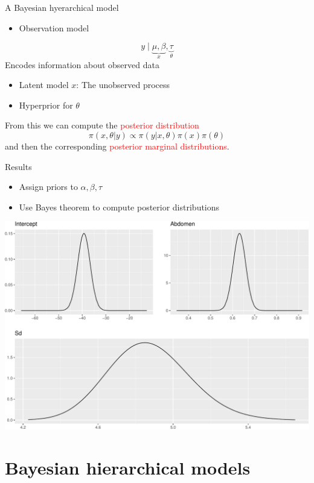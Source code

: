 \documentclass[
  ignorenonframetext,
]{beamer}
\providecommand{\tightlist}{%
  \setlength{\itemsep}{0pt}\setlength{\parskip}{0pt}}
\begin{document}
\begin{frame}{A Bayesian hyerarchical model}
\protect\hypertarget{a-bayesian-hyerarchical-model}{}
\begin{itemize}
\tightlist
\item
  Observation model
\end{itemize}

\[
y \mid \underbrace{\mu,
            \beta}_{{x}}, \underbrace{\tau}_\theta
\] Encodes information about observed data

\begin{itemize}
\item
  Latent model \(x\): The unobserved process
\item
  Hyperprior for \(\theta\)
\end{itemize}

\pause

From this we can compute the \textcolor{red}{posterior distribution} \[
\pi(x, \theta | y) \propto \pi(y | x,
     \theta) \pi(x) \pi(\theta)
\] and then the corresponding
\textcolor{red}{posterior marginal distributions}.
\end{frame}

\begin{frame}{Results}
\protect\hypertarget{results}{}
\begin{itemize}
\tightlist
\item
  Assign priors to \(\alpha,\beta,\tau\)
\item
  Use Bayes theorem to compute posterior distributions
\end{itemize}

\begin{center}\includegraphics[width=0.6\linewidth]{Part1_intro_files/figure-beamer/unnamed-chunk-7-1} \end{center}
\end{frame}

\hypertarget{bayesian-hierarchical-models}{%
\section{Bayesian hierarchical
models}\label{bayesian-hierarchical-models}}
\end{document}
